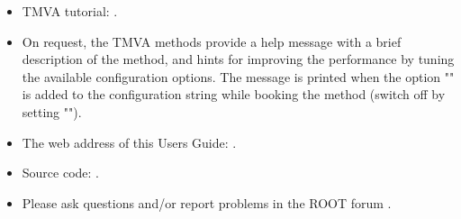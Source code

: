 \begin{itemize}


\item TMVA tutorial: .


\item On request, the TMVA methods provide a help message with a brief description of the
      method, and hints for improving the performance by tuning the available configuration
      options. The message is printed when the option "" is added to the configuration
      string while booking the method (switch off by setting "").

\item The web address of this Users Guide:
      .


\item Source code: .


\item Please ask questions and/or report problems in the ROOT forum .

\end{itemize}

